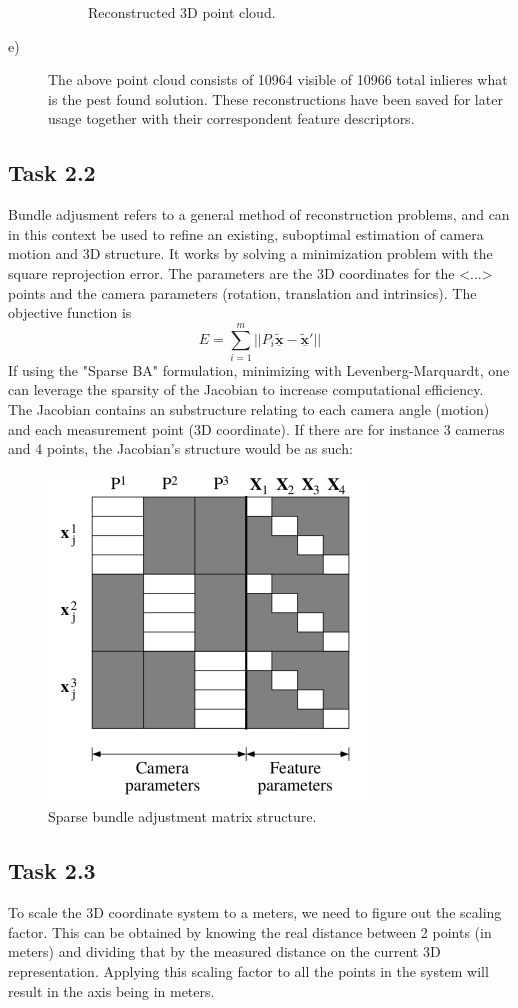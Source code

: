\documentclass[a4paper]{article} %
\begin{document}
\begin{description}
\begin{figure}[h]
                \caption{Reconstructed 3D point cloud.}
            \end{figure}
        \item [e)]  The above point cloud consists of 10964 visible of 10966 total inlieres what is the pest found solution.
                    These reconstructions have been saved for later usage together with their correspondent feature descriptors.
    \end{description}
    
    \subsection*{Task 2.2}

    Bundle adjusment refers to a general method of reconstruction problems, and can in this context be used to refine an existing, suboptimal estimation of camera motion and 3D structure.
    It works by solving a minimization problem with the square reprojection error. The parameters are the 3D coordinates for the <...> points and the camera parameters (rotation, translation and intrinsics).
    The objective function is
    $$ E=\sum_{i=1}^m ||P_i \widetilde{\underline{\textbf{x}}} - \widetilde{\underline{\textbf{x}}}'||$$
    If using the "Sparse BA" formulation, minimizing with Levenberg-Marquardt, one can leverage the sparsity of the Jacobian to increase computational efficiency.
    The Jacobian contains an substructure relating to each camera angle (motion) and each measurement point (3D coordinate).
    If there are for instance 3 cameras and 4 points, the Jacobian's structure would be as such:
    \begin{figure}[H]
        \centering
        \includegraphics[width= 0.3 \linewidth]{sparse_bundle}
        \caption{Sparse bundle adjustment matrix structure.}
    \end{figure}
    
    \subsection*{Task 2.3}
    To scale the 3D coordinate system to a meters, we need to figure out the scaling factor. 
    This can be obtained by knowing the real distance between 2 points (in meters) and dividing that by the measured distance on the current 3D representation.  
    Applying this scaling factor to all the points in the system will result in the axis being in meters.
\end{document}
